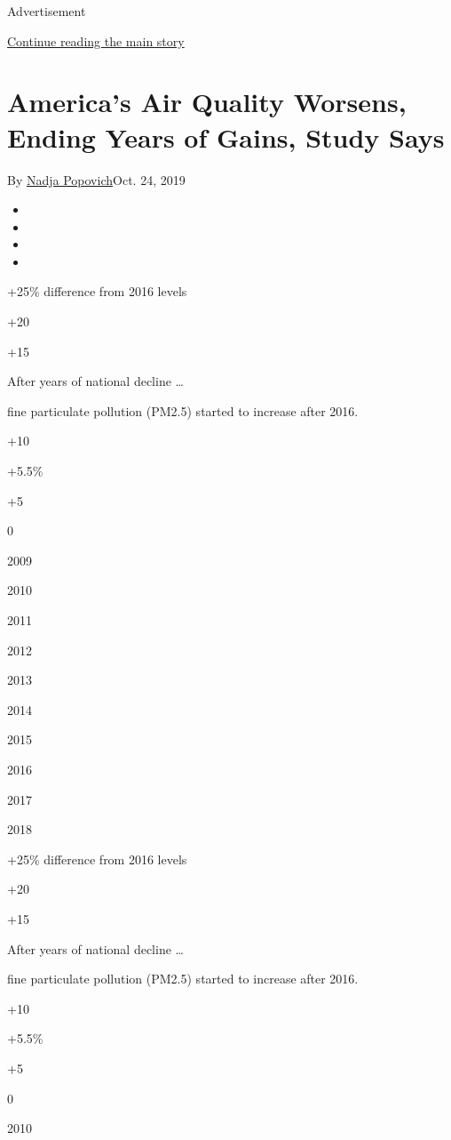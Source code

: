 Advertisement

\protect\hyperlink{after-top}{Continue reading the main story}

\hypertarget{americas-air-quality-worsens-ending-years-of-gains-study-says}{%
\section{America's Air Quality Worsens, Ending Years of Gains, Study
Says}\label{americas-air-quality-worsens-ending-years-of-gains-study-says}}

By \href{https://www.nytimes3xbfgragh.onion/by/nadja-popovich}{Nadja
Popovich}Oct. 24, 2019

\begin{itemize}
\item
\item
\item
\item
\end{itemize}

+25\% difference from 2016 levels

+20

+15

After years of national decline \ldots{}

fine particulate pollution (PM2.5) started to increase after 2016.

+10

+5.5\%

+5

0

2009

2010

2011

2012

2013

2014

2015

2016

2017

2018

+25\% difference from 2016 levels

+20

+15

After years of national decline \ldots{}

fine particulate pollution (PM2.5) started to increase after 2016.

+10

+5.5\%

+5

0

2010

